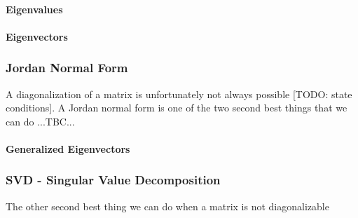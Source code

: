 \paragraph{Eigenvalues}

\paragraph{Eigenvectors}




\subsubsection{Jordan Normal Form}
A diagonalization of a matrix is unfortunately not always possible [TODO: state conditions]. A Jordan normal form is one of the two second best things that we can do ...TBC...

\paragraph{Generalized Eigenvectors}





\subsubsection{SVD - Singular Value Decomposition}

The other second best thing we can do when a matrix is not diagonalizable 


